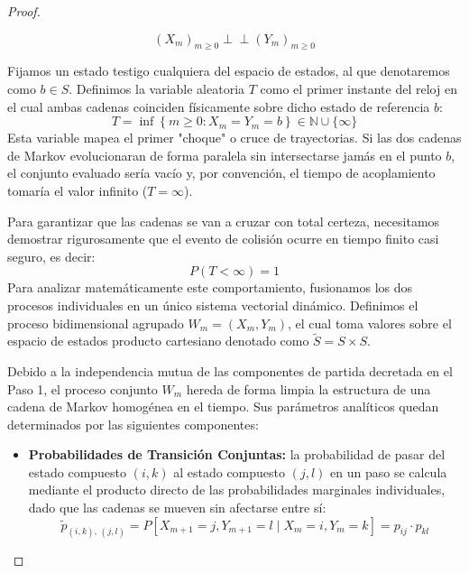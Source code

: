 \documentclass[10pt]{book}
\newcommand{\tbf}{\textbf}
\begin{document}
\begin{teo}
\begin{proof}
\begin{description}
\begin{enumerate}
        \[
        (X_m)_{m \ge 0} \perp\!\!\!\perp (Y_m)_{m \ge 0}
        \]
    \end{enumerate}
    \noindent
    Fijamos un estado testigo cualquiera del espacio de estados, al que denotaremos como $b \in S$. Definimos la variable aleatoria $T$ como el primer instante del reloj en el cual ambas cadenas coinciden físicamente sobre dicho estado de referencia $b$:
    \[
    T = \inf \left\{ m \ge 0 : X_m = Y_m = b \right\} \in \mathbb{N} \cup \{\infty\}
    \]
    Esta variable mapea el primer "choque" o cruce de trayectorias. Si las dos cadenas de Markov evolucionaran de forma paralela sin intersectarse jamás en el punto $b$, el conjunto evaluado sería vacío y, por convención, el tiempo de acoplamiento tomaría el valor infinito ($T = \infty$).

    \item[\tbf{Step 2.}] Para garantizar que las cadenas se van a cruzar con total certeza, necesitamos demostrar rigurosamente que el evento de colisión ocurre en tiempo finito casi seguro, es decir:
    \[
    P(T < \infty) = 1
    \]
    Para analizar matemáticamente este comportamiento, fusionamos los dos procesos individuales en un único sistema vectorial dinámico. Definimos el proceso bidimensional agrupado $W_m = (X_m, Y_m)$, el cual toma valores sobre el espacio de estados producto cartesiano denotado como $\widetilde{S} = S \times S$.

    
    Debido a la independencia mutua de las componentes de partida decretada en el Paso 1, el proceso conjunto $W_m$ hereda de forma limpia la estructura de una cadena de Markov homogénea en el tiempo. Sus parámetros analíticos quedan determinados por las siguientes componentes:

    \begin{itemize}
        \item \textbf{Probabilidades de Transición Conjuntas:} la probabilidad de pasar del estado compuesto $(i,k)$ al estado compuesto $(j,l)$ en un paso se calcula mediante el producto directo de las probabilidades marginales individuales, dado que las cadenas se mueven sin afectarse entre sí:
        \[
        \widetilde{p}_{(i,k), \, (j,l)} = P\left[X_{m+1}=j, Y_{m+1}=l \mid X_m=i, Y_m=k\right] = p_{ij} \cdot p_{kl}
        \]
        

\end{itemize}
\end{description}
\end{proof}
\end{teo}
\end{document}
